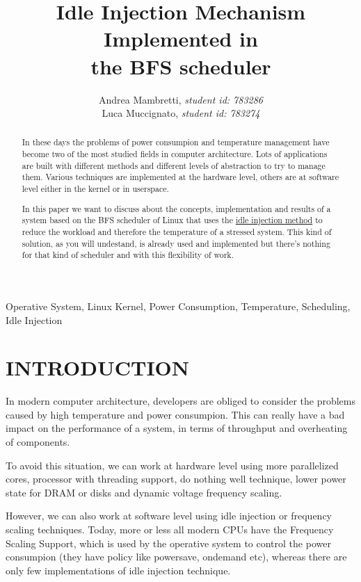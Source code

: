 \documentclass[journal]{IEEEtran}
\begin{document}
\title{Idle Injection Mechanism Implemented in\\the BFS scheduler}

\author{Andrea Mambretti, \emph{student id: 783286}\\Luca Muccignato, \emph{student id: 783274}}
\maketitle

\begin{abstract}
In these days the problems of power consumpion and temperature management
have become two of the most studied fields in computer architecture.
Lots of applications are built with different methods and different
levels of abstraction to try to manage them. Various techniques are
implemented at the hardware level, others are at software level either
in the kernel or in userspace.

In this paper we want to discuss about the concepts, implementation
and results of a system based on the BFS scheduler of Linux that uses
the \underline{idle injection method} to reduce the workload and
therefore the temperature of a stressed system. This kind of solution,
as you will undestand, is already used and implemented but there's
nothing for that kind of scheduler and with this flexibility of work.
\end{abstract}
\begin{keywords}Operative System, Linux Kernel, Power Consumption,
Temperature, Scheduling, Idle Injection \end{keywords}


\section{INTRODUCTION}

In modern computer architecture, developers are obliged to consider
the problems caused by high temperature and power consumpion. This
can really have a bad impact on the performance of a system, in terms
of throughput and overheating of components.

To avoid this situation, we can work at hardware level using more
parallelized cores, processor with threading support, do nothing well
technique, lower power state for DRAM or disks and dynamic voltage
frequency scaling.

However, we can also work at software level using idle injection or
frequency scaling techniques. Today, more or less all modern CPUs
have the Frequency Scaling Support, which is used by the operative
system to control the power consumpion (they have policy like powersave,
ondemand etc), whereas there are only few implementations of idle
injection technique.
\end{document}
